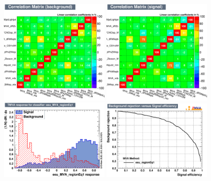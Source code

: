 \begin{figure}[htbp]
	\includegraphics[width=0.48\textwidth]{6_Search/Figures/MVAtechnics/toppairzut/eeu/CorrelationMatrixB.png}
	\includegraphics[width=0.48\textwidth]{6_Search/Figures/MVAtechnics/toppairzut/eeu/CorrelationMatrixS.png}
	\includegraphics[width=0.48\textwidth]{6_Search/Figures/MVAtechnics/toppairzut/eeu/mva_eeu_MVA_regionEq1.png}
	\includegraphics[width=0.48\textwidth]{6_Search/Figures/MVAtechnics/toppairzut/eeu/rejBvsS.png}

\end{figure}
